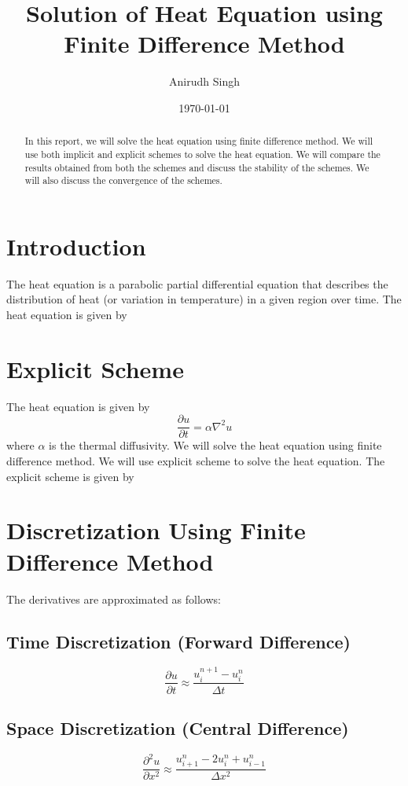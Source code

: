 \documentclass[12pt]{article}
\title{Solution of Heat Equation using Finite Difference Method}
\author{Anirudh Singh}
\date{\today}
\begin{document}
\maketitle
\begin{abstract}
In this report, we will solve the heat equation using finite difference method. We will use both implicit and explicit schemes to solve the heat equation. We will compare the results obtained from both the schemes and discuss the stability of the schemes. We will also discuss the convergence of the schemes.
\end{abstract}

\section{Introduction}
The heat equation is a parabolic partial differential equation that describes the distribution of heat (or variation in temperature) in a given region over time. The heat equation is given by

\section{Explicit Scheme}
The heat equation is given by
\begin{equation}
\frac{\partial u}{\partial t} = \alpha \nabla^2 u
\end{equation}
where $\alpha$ is the thermal diffusivity. We will solve the heat equation using finite difference method. We will use explicit scheme to solve the heat equation. The explicit scheme is given by



\section{Discretization Using Finite Difference Method}
The derivatives are approximated as follows:

\subsection{Time Discretization (Forward Difference)}
\begin{equation}
    \frac{\partial u}{\partial t} \approx \frac{u_i^{n+1} - u_i^n}{\Delta t}
\end{equation}

\subsection{Space Discretization (Central Difference)}
\begin{equation}
    \frac{\partial^2 u}{\partial x^2} \approx \frac{u_{i+1}^n - 2u_i^n + u_{i-1}^n}{\Delta x^2}
\end{equation}
\end{document}
